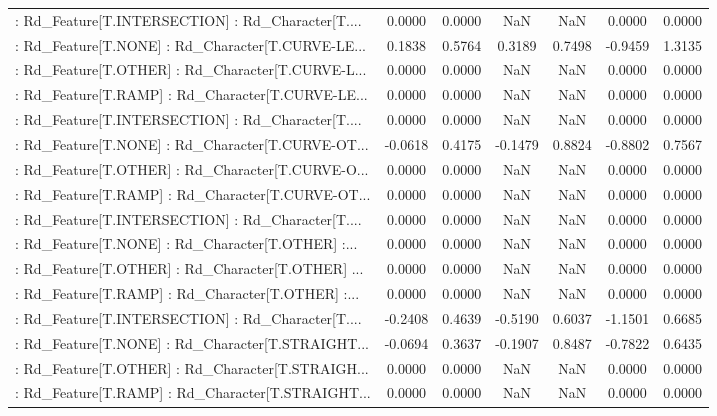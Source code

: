 \begin{longtable}{p{4cm}cccccc}
 : Rd\_Feature[T.INTERSECTION] : Rd\_Character[T.... &  0.0000 &    0.0000 &     NaN &          NaN &  0.0000 &  0.0000 \\
 : Rd\_Feature[T.NONE] : Rd\_Character[T.CURVE-LE... &  0.1838 &    0.5764 &  0.3189 &       0.7498 & -0.9459 &  1.3135 \\
 : Rd\_Feature[T.OTHER] : Rd\_Character[T.CURVE-L... &  0.0000 &    0.0000 &     NaN &          NaN &  0.0000 &  0.0000 \\
 : Rd\_Feature[T.RAMP] : Rd\_Character[T.CURVE-LE... &  0.0000 &    0.0000 &     NaN &          NaN &  0.0000 &  0.0000 \\
 : Rd\_Feature[T.INTERSECTION] : Rd\_Character[T.... &  0.0000 &    0.0000 &     NaN &          NaN &  0.0000 &  0.0000 \\
 : Rd\_Feature[T.NONE] : Rd\_Character[T.CURVE-OT... & -0.0618 &    0.4175 & -0.1479 &       0.8824 & -0.8802 &  0.7567 \\
 : Rd\_Feature[T.OTHER] : Rd\_Character[T.CURVE-O... &  0.0000 &    0.0000 &     NaN &          NaN &  0.0000 &  0.0000 \\
 : Rd\_Feature[T.RAMP] : Rd\_Character[T.CURVE-OT... &  0.0000 &    0.0000 &     NaN &          NaN &  0.0000 &  0.0000 \\
 : Rd\_Feature[T.INTERSECTION] : Rd\_Character[T.... &  0.0000 &    0.0000 &     NaN &          NaN &  0.0000 &  0.0000 \\
 : Rd\_Feature[T.NONE] : Rd\_Character[T.OTHER] :... &  0.0000 &    0.0000 &     NaN &          NaN &  0.0000 &  0.0000 \\
 : Rd\_Feature[T.OTHER] : Rd\_Character[T.OTHER] ... &  0.0000 &    0.0000 &     NaN &          NaN &  0.0000 &  0.0000 \\
 : Rd\_Feature[T.RAMP] : Rd\_Character[T.OTHER] :... &  0.0000 &    0.0000 &     NaN &          NaN &  0.0000 &  0.0000 \\
 : Rd\_Feature[T.INTERSECTION] : Rd\_Character[T.... & -0.2408 &    0.4639 & -0.5190 &       0.6037 & -1.1501 &  0.6685 \\
 : Rd\_Feature[T.NONE] : Rd\_Character[T.STRAIGHT... & -0.0694 &    0.3637 & -0.1907 &       0.8487 & -0.7822 &  0.6435 \\
 : Rd\_Feature[T.OTHER] : Rd\_Character[T.STRAIGH... &  0.0000 &    0.0000 &     NaN &          NaN &  0.0000 &  0.0000 \\
 : Rd\_Feature[T.RAMP] : Rd\_Character[T.STRAIGHT... &  0.0000 &    0.0000 &     NaN &          NaN &  0.0000 &  0.0000 \\

\end{longtable}
